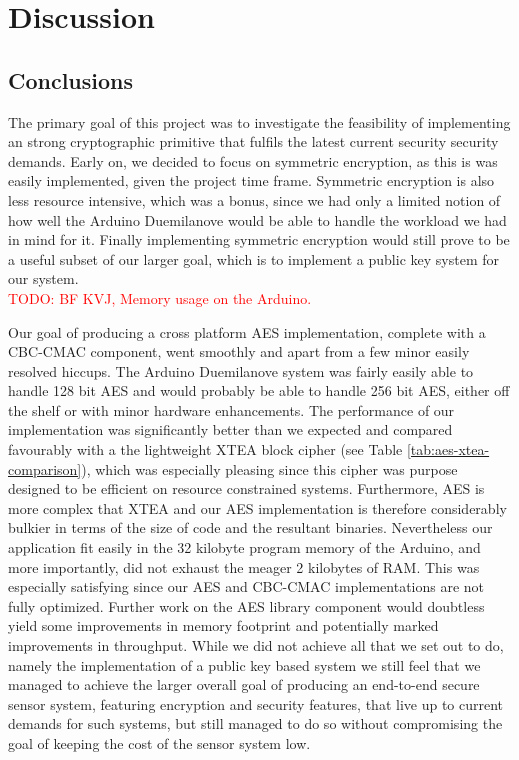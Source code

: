 
\chapter{Discussion}
\label{sec:discussion}


\section{Conclusions}

The primary goal of this project was to investigate the feasibility of implementing an strong cryptographic primitive that fulfils the latest current security security demands. Early on, we decided to focus on symmetric encryption, as this is was easily implemented, given the project time frame. Symmetric encryption is also less resource intensive, which was a bonus, since we had only a limited notion of how well the Arduino Duemilanove would be able to handle the workload we had in mind for it. Finally implementing symmetric encryption would still prove to be a useful subset of our larger goal, which is to implement a public key system for our system.\\

\textcolor{red}{TODO: BF KVJ, Memory usage on the Arduino.} 

Our goal of producing a cross platform AES implementation, complete with a CBC-CMAC component, went smoothly and apart from a few minor easily resolved hiccups. The Arduino Duemilanove system was fairly easily able to handle 128 bit AES and would probably be able to handle 256 bit AES, either off the shelf or with minor hardware enhancements. The performance of our implementation was significantly better than we expected and compared favourably with a the lightweight XTEA block cipher (see Table \ref{tab:aes-xtea-comparison}), which was especially pleasing since this cipher was purpose designed to be efficient on resource constrained systems. Furthermore, AES is more complex that XTEA and our AES implementation is therefore considerably bulkier in terms of the size of code and the resultant binaries. Nevertheless our application fit easily in the 32 kilobyte program memory of the Arduino, and more importantly, did not exhaust the meager 2 kilobytes of RAM. This was especially satisfying since our AES and CBC-CMAC implementations are not fully optimized. Further work on the AES library component would doubtless yield some improvements in memory footprint and potentially marked improvements in throughput. While we did not achieve all that we set out to do, namely the implementation of a public key based system we still feel that we managed to achieve the larger overall goal of producing an end-to-end secure sensor system, featuring encryption and security features, that live up to current demands for such systems, but still managed to do so without compromising the goal of keeping the cost of the sensor system low.\\

